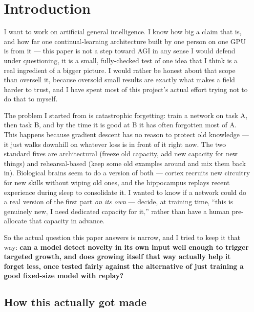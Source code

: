 \documentclass[11pt,letterpaper]{article}
\begin{document}
\section{Introduction}

I want to work on artificial general intelligence. I know how big a claim that is, and how far one continual-learning architecture built by one person on one GPU is from it --- this paper is not a step toward AGI in any sense I would defend under questioning, it is a small, fully-checked test of one idea that I think is a real ingredient of a bigger picture. I would rather be honest about that scope than oversell it, because oversold small results are exactly what makes a field harder to trust, and I have spent most of this project's actual effort trying not to do that to myself.

The problem I started from is catastrophic forgetting: train a network on task A, then task B, and by the time it is good at B it has often forgotten most of A. This happens because gradient descent has no reason to protect old knowledge --- it just walks downhill on whatever loss is in front of it right now. The two standard fixes are architectural (freeze old capacity, add new capacity for new things) and rehearsal-based (keep some old examples around and mix them back in). Biological brains seem to do a version of both --- cortex recruits new circuitry for new skills without wiping old ones, and the hippocampus replays recent experience during sleep to consolidate it. I wanted to know if a network could do a real version of the first part \emph{on its own} --- decide, at training time, ``this is genuinely new, I need dedicated capacity for it,'' rather than have a human pre-allocate that capacity in advance.

So the actual question this paper answers is narrow, and I tried to keep it that way: \textbf{can a model detect novelty in its own input well enough to trigger targeted growth, and does growing itself that way actually help it forget less, once tested fairly against the alternative of just training a good fixed-size model with replay?}

\subsection{How this actually got made}
\label{sec:intro-collab}
\end{document}
